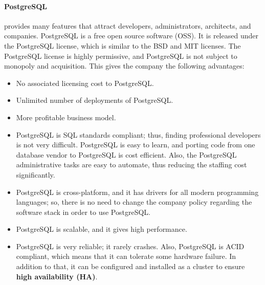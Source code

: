 \paragraph{PostgreSQL} provides many features that attract developers, administrators, architects, and companies.
PostgreSQL is a free open source software (OSS). It is released under the PostgreSQL license, which is similar to the BSD and MIT licenses. The PostgreSQL license is highly permissive, and PostgreSQL is not subject to monopoly and acquisition. This gives the company the following advantages:
\begin{itemize}
	\item No associated licensing cost to PostgreSQL.
	\item Unlimited number of deployments of PostgreSQL.
	\item More profitable business model.
	\item PostgreSQL is SQL standards compliant; thus, finding professional developers is not very difficult. PostgreSQL is easy to learn, and porting code from one database vendor to PostgreSQL is cost efficient. Also, the PostgreSQL administrative tasks are easy to automate, thus reducing the staffing cost significantly.
	\item PostgreSQL is cross-platform, and it has drivers for all modern programming languages; so, there is no need to change the company policy regarding the software stack in order to use PostgreSQL.
	\item PostgreSQL is scalable, and it gives high performance.
	\item PostgreSQL is very reliable; it rarely crashes. Also, PostgreSQL is ACID compliant, which means that it can tolerate some hardware failure. In addition to that, it can be configured and installed as a cluster to ensure \textbf{high availability (HA)}.
\end{itemize}


